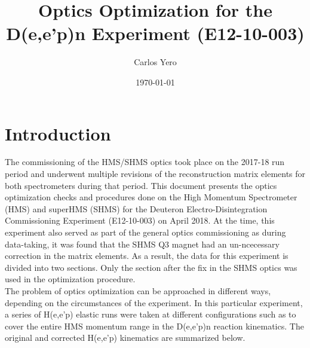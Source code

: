 \documentclass[11pt]{article}
\begin{document}
\title{\Large \bf{Optics Optimization for the D(e,e'p)n Experiment (E12-10-003)}}

\author{Carlos Yero}

\date{\today}
\maketitle



\section{Introduction}
\noindent The commissioning of the HMS/SHMS optics took place on the 2017-18 run period and underwent multiple revisions of the reconstruction
matrix elements for both spectrometers during that period.\cite{HMS_Optics, SHMS_Optics} This document presents the optics optimization checks
and procedures done on the High Momentum Spectrometer (HMS) and superHMS (SHMS) for the Deuteron Electro-Disintegration Commissioning Experiment
(E12-10-003) on April 2018. At the time, this experiment also served as part of the general optics commissioning as during data-taking, it was found that
the SHMS Q3 magnet had an un-ncecessary correction in the matrix elements. As a result, the data for this experiment is divided into two sections.
Only the section after the fix in the SHMS optics was used in the optimization procedure.\\
\indent The problem of optics optimization can be approached in different ways, depending on the circumstances
of the experiment. In this particular experiment, a series of H(e,e'p) elastic runs were taken at different
configurations such as to cover the entire HMS momentum range in the D(e,e'p)n reaction kinematics. The original
and corrected H(e,e'p) kinematics are summarized below.
\end{document}

